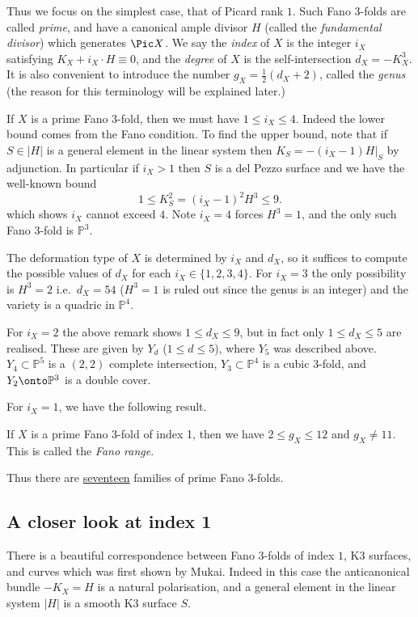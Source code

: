 Thus we focus on the simplest case, that of Picard rank \(1\). Such
Fano 3-folds are called \textit{prime}, and have a canonical ample divisor \(H\)
(called the \textit{fundamental divisor}) which generates \(\Pic X\). We say the
\textit{index} of \(X\) is the integer \(i_X\) satisfying \(K_X+i_X \cdot H
\equiv 0\), and the \textit{degree} of \(X\) is the self-intersection
\(d_X=-K_X^3\). It is also convenient to introduce the number
\(g_X=\frac{1}{2}(d_X+2)\), called the \textit{genus} (the reason for this
terminology will be explained later.)

\begin{remark}
    If \(X\) is a prime Fano 3-fold, then we must have \(1\leq i_X\leq 4\).
    Indeed the lower bound comes from the Fano condition. To find the upper
    bound, note that if \(S\in |H|\) is a general element in the linear system
    then \(K_S=-(i_X-1)H|_S\) by adjunction. In particular if \(i_X>1\) then
    \(S\) is a del Pezzo surface and we have the well-known bound
    \[1\leq K_S^2=(i_X-1)^2H^3\leq 9.\]
    which shows \(i_X\) cannot exceed \(4\). Note \(i_X=4\) forces \(H^3=1\),
    and the only such Fano 3-fold is \(\mathbb{P}^3\).
\end{remark}

The deformation type of \(X\) is determined by \(i_X\) and \(d_X\), so it
suffices to compute the possible values of \(d_X\) for each \(i_X\in
\{1,2,3,4\}\). For \(i_X=3\) the only possibility is \(H^3=2\) i.e.\ \(d_X=54\)
(\(H^3=1\) is ruled out since the genus is an integer) and the variety is a
quadric in \(\mathbb{P}^4\).

For \(i_X=2\) the above remark shows \(1\leq d_X\leq 9\), but
in fact only \(1\leq d_X\leq 5\) are realised. These are given by \(Y_d\)
(\(1\leq d\leq 5\)), where \(Y_5\) was described above. \(Y_4\subset
\mathbb{P}^5\) is a \((2,2)\) complete intersection, \(Y_3\subset \mathbb{P}^4\)
is a cubic 3-fold, and \(Y_2\onto \mathbb{P}^3\) is a double cover.

For \(i_X=1\), we have the following result.

\begin{theorem}[(Ishkowskii)]
    If \(X\) is a prime Fano 3-fold of index 1, then we have \(2\leq g_X \leq
    12\) and \(g_X\neq 11\). This is called the \emph{Fano range}.
\end{theorem}

Thus there are \underline{seventeen} families of prime Fano 3-folds.

\subsection{A closer look at index 1} There is a beautiful correspondence
between Fano 3-folds of index \(1\), K3 surfaces, and curves which was first
shown by Mukai. Indeed in this case the anticanonical bundle \(-K_X=H\) is a
natural polarisation, and a general element in the linear system
\(|H|\) is a smooth K3 surface \(S\).


